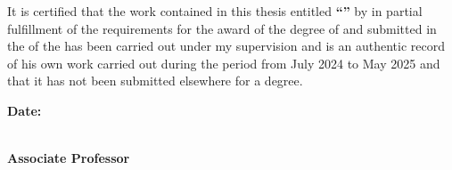 \documentclass[11pt, a4paper, twoside]{Thesis} %
\begin{document}
\vfill

\clearpage %


\begin{minipage}{\textwidth}
    
    It is certified that the work contained in this thesis entitled \textbf{\enquote{\ttitle}} by \textbf{\authornames} in partial fulfillment of the requirements for the award of the degree of \textbf{\degreename} and submitted in the \textbf{\deptname} of the \textbf{\univname} has been carried out under my supervision and is an authentic record of his own work carried out during the period from July 2024 to May 2025 and that it has not been submitted elsewhere for a degree.
        
\end{minipage}

\vspace{20.00mm}

\begin{minipage}{0.39\textwidth}
		\begin{flushleft}
            {\textbf{Date:}}
		\end{flushleft}
\end{minipage}
\begin{minipage}{0.59\textwidth}
		\begin{flushright}
            {\textbf{\supnameA}\\ 
            \textbf{Associate Professor}\\
            \textbf{\deptname}\\
            \textbf{\univname}}
		\end{flushright}
\end{minipage}
\vfill
\

\clearpage %
\end{document}
